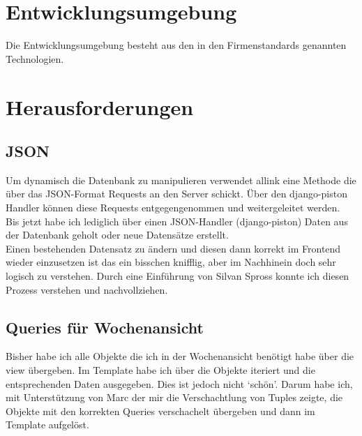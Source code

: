 \section{Entwicklungsumgebung}
Die Entwicklungsumgebung besteht aus den in den Firmenstandards genannten Technologien.
\section{Herausforderungen}
\subsection{JSON}
Um dynamisch die Datenbank zu manipulieren verwendet allink eine Methode die über das JSON-Format Requests an den Server schickt. 
Über den django-piston Handler können diese Requests entgegengenommen und weitergeleitet werden.\\
Bis jetzt habe ich lediglich über einen JSON-Handler (django-piston) Daten aus der Datenbank geholt oder neue Datensätze erstellt.\\
Einen bestehenden Datensatz zu ändern und diesen dann korrekt im Frontend wieder einzusetzen ist das ein bisschen knifflig, aber im Nachhinein doch sehr logisch zu verstehen.
Durch eine Einführung von Silvan Spross konnte ich diesen Prozess verstehen und nachvollziehen.
\subsection{Queries für Wochenansicht}
Bisher habe ich alle Objekte die ich in der Wochenansicht benötigt habe über die view übergeben.
Im Template habe ich über die Objekte iteriert und die entsprechenden Daten ausgegeben. Dies ist jedoch nicht `schön'. 
Darum habe ich, mit Unterstützung von Marc der mir die Verschachtlung von Tuples zeigte, die Objekte mit den korrekten Queries verschachelt übergeben und dann im Template aufgelöst.
